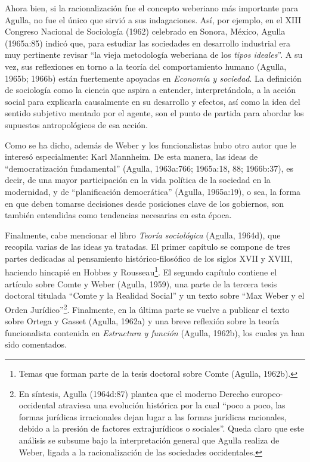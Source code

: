 Ahora bien, si la racionalización fue el concepto weberiano más importante para Agulla, no fue el único que sirvió a sus indagaciones. Así, por ejemplo, en el XIII Congreso Nacional de Sociología (1962) celebrado en Sonora, México, Agulla (1965a:85) indicó que, para estudiar las sociedades en desarrollo industrial era muy pertinente revisar ``la vieja metodología weberiana de los \emph{tipos ideales}''. A su vez, sus reflexiones en torno a la teoría del comportamiento humano (Agulla, 1965b; 1966b) están fuertemente apoyadas en \emph{Economía y sociedad}. La definición de sociología como la ciencia que aspira a entender, interpretándola, a la acción social para explicarla causalmente en su desarrollo y efectos, así como la idea del sentido subjetivo mentado por el agente, son el punto de partida para abordar los supuestos antropológicos de esa acción.

Como se ha dicho, además de Weber y los funcionalistas hubo otro autor que le interesó especialmente: Karl Mannheim. De esta manera, las ideas de ``democratización fundamental'' (Agulla, 1963a:766; 1965a:18, 88; 1966b:37), es decir, de una mayor participación en la vida política de la sociedad en la modernidad, y de ``planificación democrática'' (Agulla, 1965a:19), o sea, la forma en que deben tomarse decisiones desde posiciones clave de los gobiernos, son también entendidas como tendencias necesarias en esta época.

Finalmente, cabe mencionar el libro \emph{Teoría sociológica} (Agulla, 1964d), que recopila varias de las ideas ya tratadas. El primer capítulo se compone de tres partes dedicadas al pensamiento histórico-filosófico de los siglos XVII y XVIII, haciendo hincapié en Hobbes y Rousseau\footnote{Temas que forman parte de la tesis doctoral sobre Comte (Agulla, 1962b).}. El segundo capítulo contiene el artículo sobre Comte y Weber (Agulla, 1959), una parte de la tercera tesis doctoral titulada ``Comte y la Realidad Social'' y un texto sobre ``Max Weber y el Orden Jurídico''\footnote{En síntesis, Agulla (1964d:87) plantea que el moderno Derecho europeo-occidental atraviesa una evolución histórica por la cual ``poco a poco, las formas jurídicas irracionales dejan lugar a las formas jurídicas racionales, debido a la presión de factores extrajurídicos o sociales''. Queda claro que este análisis se subsume bajo la interpretación general que Agulla realiza de Weber, ligada a la racionalización de las sociedades occidentales.}. Finalmente, en la última parte se vuelve a publicar el texto sobre Ortega y Gasset (Agulla, 1962a) y una breve reflexión sobre la teoría funcionalista contenida en \emph{Estructura y función} (Agulla, 1962b), los cuales ya han sido comentados.

